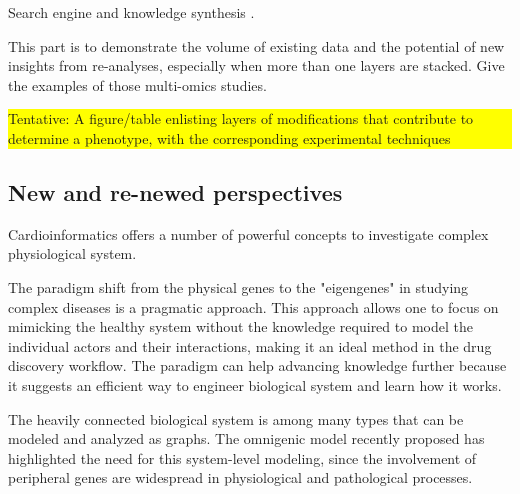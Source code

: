 \documentclass[letter]{bioinfo}
\newcommand{\todo}[1]{\colorbox{yellow}{\parbox{1\linewidth}{#1}}}
\begin{document}
Search engine and knowledge synthesis \citep{Lutjohann:2011:Sciencenet}.


This part is to demonstrate the volume of existing data and the potential of new insights from re-analyses, especially when more than one layers are stacked. Give the examples of those multi-omics studies.


\todo{Tentative: A figure/table enlisting layers of modifications that contribute to determine a phenotype, with the corresponding experimental techniques}

\cite{Santolini:2018:personalized} 

\cite{Klarin:2017:Genetic}


%
%

\subsection{New and re-newed perspectives}

Cardioinformatics offers a number of powerful concepts to investigate complex physiological system.

The paradigm shift from the physical genes to the "eigengenes" in studying complex diseases \citep{Weiss:2012:Good} is a pragmatic approach. This approach allows one to focus on mimicking the healthy system without the knowledge required to model the individual actors and their interactions, making it an ideal method in the drug discovery workflow. The paradigm can help advancing knowledge further because it suggests an efficient way to engineer biological system and learn how it works.

The heavily connected biological system is among many types that can be modeled and analyzed as graphs. The omnigenic model recently proposed has highlighted the need for this system-level modeling, since the involvement of peripheral genes are widespread in physiological and pathological processes.
\end{document}
